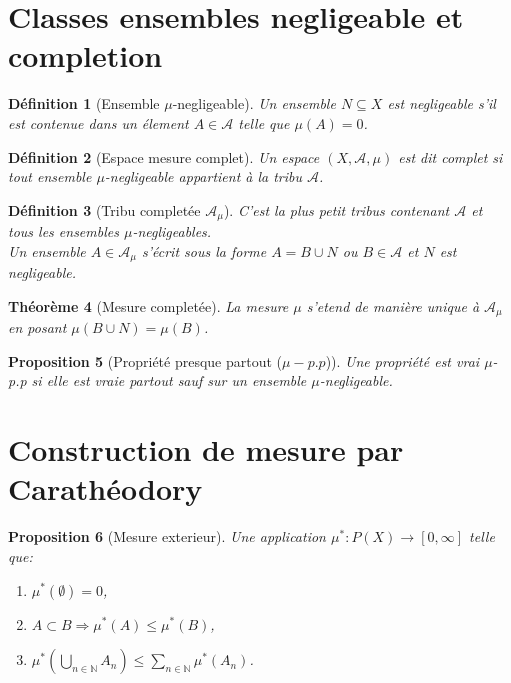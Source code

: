 \documentclass[a4paper,12pt,french]{report}
\theoremstyle{break}
\newtheorem{defin}{Définition}[section]
\newtheorem{theo}[defin]{Théorème}
\newtheorem{prop}[defin]{Proposition}
\begin{document}
\section{Classes ensembles negligeable et completion}
\begin{defin}[Ensemble $\mu$-negligeable]
Un ensemble $N \subseteq X$ est negligeable s'il est contenue dans un élement $A \in \mathcal{A}$ telle que $\mu (A) = 0$.
\end{defin}

\begin{defin}[Espace mesure complet]
Un espace $(X, \mathcal{A}, \mu)$ est dit complet si tout ensemble $\mu$-negligeable appartient à la tribu $\mathcal{A}$.
\end{defin}

\begin{defin}[Tribu completée $\mathcal{A}_{\mu}$]
C'est la plus petit tribus contenant $\mathcal{A}$ et tous les ensembles $\mu$-negligeables.\\ Un ensemble $A \in \mathcal{A}_{\mu}$ s'écrit sous la forme $A = B \cup N$ ou $B \in \mathcal{A}$ et $N$ est negligeable.
\end{defin}

\begin{theo}[Mesure completée]
La mesure $\mu$ s'etend de manière unique à $\mathcal{A}_{\mu}$ en posant $\mu (B \cup N) = \mu (B)$.
\end{theo}

\begin{prop}[Propriété presque partout ($\mu-p.p$)]
Une propriété est vrai $\mu$-p.p si elle est vraie partout sauf sur un ensemble $\mu$-negligeable.
\end{prop}

\section{Construction de mesure par Carathéodory}
\begin{prop}[Mesure exterieur]
       Une application $\mu^{*} : P(X) \rightarrow [0, \infty]$ telle que:
       \begin{enumerate}
              \item $\mu^{*}(\emptyset) = 0$,
              \item $A \subset B \Rightarrow \mu^{*}(A) \leq \mu^{*}(B)$,
              \item $\displaystyle \mu^{*}(\bigcup_{n \in \mathbb{N}} A_{n}) \leq \sum_{n \in \mathbb{N}} \mu^{*}(A_{n})$.
       \end{enumerate}
\end{prop}
\end{document}
